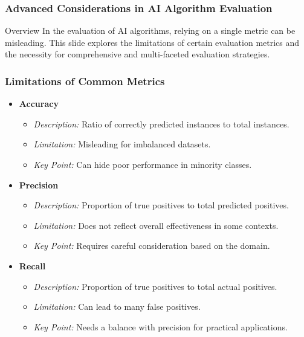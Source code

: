 \documentclass[aspectratio=169]{beamer}
\begin{document}
\begin{frame}[fragile]
    \frametitle{Advanced Considerations in AI Algorithm Evaluation}
    \begin{block}{Overview}
        In the evaluation of AI algorithms, relying on a single metric can be misleading. This slide explores the limitations of certain evaluation metrics and the necessity for comprehensive and multi-faceted evaluation strategies.
    \end{block}
\end{frame}

\begin{frame}[fragile]
    \frametitle{Limitations of Common Metrics}
    \begin{itemize}
        \item \textbf{Accuracy}
            \begin{itemize}
                \item \textit{Description:} Ratio of correctly predicted instances to total instances.
                \item \textit{Limitation:} Misleading for imbalanced datasets.
                \item \textit{Key Point:} Can hide poor performance in minority classes.
            \end{itemize}
        
        \item \textbf{Precision}
            \begin{itemize}
                \item \textit{Description:} Proportion of true positives to total predicted positives.
                \item \textit{Limitation:} Does not reflect overall effectiveness in some contexts.
                \item \textit{Key Point:} Requires careful consideration based on the domain.
            \end{itemize}
        
        \item \textbf{Recall}
            \begin{itemize}
                \item \textit{Description:} Proportion of true positives to total actual positives.
                \item \textit{Limitation:} Can lead to many false positives.
                \item \textit{Key Point:} Needs a balance with precision for practical applications.
            \end{itemize}
    \end{itemize}
\end{frame}
\end{document}
